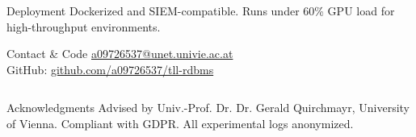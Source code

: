 \documentclass[final]{beamer}
\begin{document}
\begin{frame}[t]
\begin{columns}[t]
\begin{column}{0.32\textwidth}
\begin{block}{Deployment}
Dockerized and SIEM-compatible. Runs under 60\% GPU load for high-throughput environments.
\end{block}

\begin{block}{Contact \& Code}
\href{mailto:a09726537@unet.univie.ac.at}{a09726537@unet.univie.ac.at} \\ 
GitHub: \href{https://github.com/a09726537/tll-rdbms}{github.com/a09726537/tll-rdbms}
\end{block}
\end{column}

\end{columns}

\vspace{1cm}
\begin{block}{Acknowledgments}
Advised by Univ.-Prof. Dr. Dr. Gerald Quirchmayr, University of Vienna. Compliant with GDPR. All experimental logs anonymized.
\end{block}

\end{frame}
\end{document}
